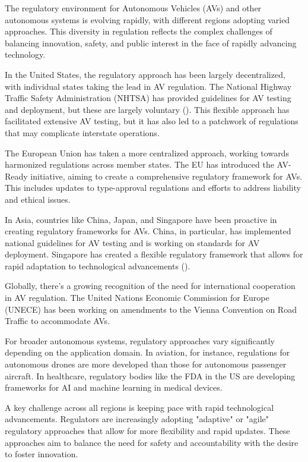 The regulatory environment for Autonomous Vehicles (AVs) and other autonomous systems is evolving rapidly, with different regions adopting varied approaches. This diversity in regulation reflects the complex challenges of balancing innovation, safety, and public interest in the face of rapidly advancing technology.

In the United States, the regulatory approach has been largely decentralized, with individual states taking the lead in AV regulation. The National Highway Traffic Safety Administration (NHTSA) has provided guidelines for AV testing and deployment, but these are largely voluntary (\cite{nhtsa2020}). This flexible approach has facilitated extensive AV testing, but it has also led to a patchwork of regulations that may complicate interstate operations.

The European Union has taken a more centralized approach, working towards harmonized regulations across member states. The EU has introduced the AV-Ready initiative, aiming to create a comprehensive regulatory framework for AVs. This includes updates to type-approval regulations and efforts to address liability and ethical issues.

In Asia, countries like China, Japan, and Singapore have been proactive in creating regulatory frameworks for AVs. China, in particular, has implemented national guidelines for AV testing and is working on standards for AV deployment. Singapore has created a flexible regulatory framework that allows for rapid adaptation to technological advancements (\cite{Taeihagh2019}).

Globally, there's a growing recognition of the need for international cooperation in AV regulation. The United Nations Economic Commission for Europe (UNECE) has been working on amendments to the Vienna Convention on Road Traffic to accommodate AVs.

For broader autonomous systems, regulatory approaches vary significantly depending on the application domain. In aviation, for instance, regulations for autonomous drones are more developed than those for autonomous passenger aircraft. In healthcare, regulatory bodies like the FDA in the US are developing frameworks for AI and machine learning in medical devices.

A key challenge across all regions is keeping pace with rapid technological advancements. Regulators are increasingly adopting "adaptive" or "agile" regulatory approaches that allow for more flexibility and rapid updates. These approaches aim to balance the need for safety and accountability with the desire to foster innovation.

